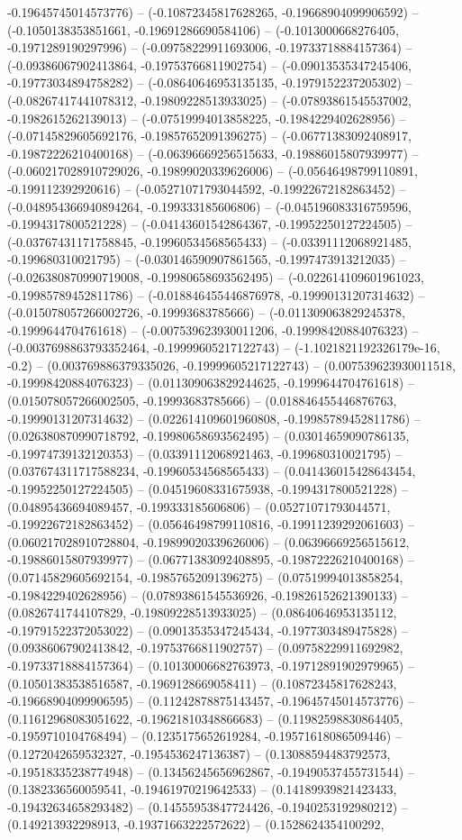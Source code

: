 -0.19645745014573776) -- (-0.10872345817628265, -0.19668904099906592) -- (-0.1050138353851661, -0.19691286690584106) -- (-0.1013000668276405, -0.1971289190297996) -- (-0.09758229911693006, -0.19733718884157364) -- (-0.09386067902413864, -0.19753766811902754) -- (-0.09013535347245406, -0.19773034894758282) -- (-0.08640646953135135, -0.1979152237205302) -- (-0.08267417441078312, -0.19809228513933025) -- (-0.07893861545537002, -0.1982615262139013) -- (-0.07519994013858225, -0.1984229402628956) -- (-0.07145829605692176, -0.19857652091396275) -- (-0.06771383092408917, -0.19872226210400168) -- (-0.06396669256515633, -0.19886015807939977) -- (-0.060217028910729026, -0.19899020339626006) -- (-0.05646498799110891, -0.199112392920616) -- (-0.05271071793044592, -0.19922672182863452) -- (-0.048954366940894264, -0.199333185606806) -- (-0.045196083316759596, -0.1994317800521228) -- (-0.04143601542864367, -0.19952250127224505) -- (-0.03767431171758845, -0.19960534568565433) -- (-0.03391112068921485, -0.199680310021795) -- (-0.030146590907861565, -0.1997473913212035) -- (-0.026380870990719008, -0.19980658693562495) -- (-0.022614109601961023, -0.19985789452811786) -- (-0.018846455446876978, -0.19990131207314632) -- (-0.015078057266002726, -0.19993683785666) -- (-0.011309063829245378, -0.1999644704761618) -- (-0.007539623930011206, -0.19998420884076323) -- (-0.0037698863793352464, -0.19999605217122743) -- (-1.1021821192326179e-16, -0.2) -- (0.003769886379335026, -0.19999605217122743) -- (0.007539623930011518, -0.19998420884076323) -- (0.011309063829244625, -0.1999644704761618) -- (0.015078057266002505, -0.19993683785666) -- (0.018846455446876763, -0.19990131207314632) -- (0.022614109601960808, -0.19985789452811786) -- (0.026380870990718792, -0.19980658693562495) -- (0.03014659090786135, -0.19974739132120353) -- (0.03391112068921463, -0.199680310021795) -- (0.037674311717588234, -0.19960534568565433) -- (0.041436015428643454, -0.19952250127224505) -- (0.04519608331675938, -0.1994317800521228) -- (0.04895436694089457, -0.199333185606806) -- (0.05271071793044571, -0.19922672182863452) -- (0.05646498799110816, -0.19911239292061603) -- (0.060217028910728804, -0.19899020339626006) -- (0.06396669256515612, -0.19886015807939977) -- (0.06771383092408895, -0.19872226210400168) -- (0.07145829605692154, -0.19857652091396275) -- (0.07519994013858254, -0.1984229402628956) -- (0.07893861545536926, -0.19826152621390133) -- (0.0826741744107829, -0.19809228513933025) -- (0.08640646953135112, -0.19791522372053022) -- (0.09013535347245434, -0.1977303489475828) -- (0.09386067902413842, -0.19753766811902757) -- (0.09758229911692982, -0.19733718884157364) -- (0.10130006682763973, -0.19712891902979965) -- (0.10501383538516587, -0.1969128669058411) -- (0.10872345817628243, -0.19668904099906595) -- (0.11242878875143457, -0.19645745014573776) -- (0.11612968083051622, -0.19621810348866683) -- (0.11982598830864405, -0.1959710104768494) -- (0.1235175652619284, -0.19571618086509446) -- (0.1272042659532327, -0.1954536247136387) -- (0.13088594483792573, -0.19518335238774948) -- (0.13456245656962867, -0.19490537455731544) -- (0.1382336560059541, -0.19461970219642533) -- (0.14189939821423433, -0.19432634658293482) -- (0.14555953847724426, -0.1940253192980212) -- (0.149213932298913, -0.19371663222572622) -- (0.1528624354100292, 